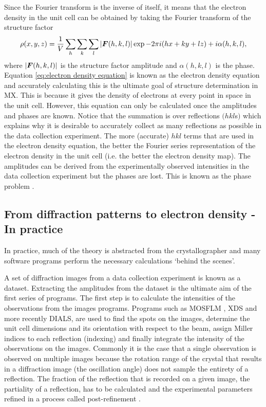         Since the Fourier transform is the inverse of itself, it means that the electron density in the unit cell can be obtained by taking the Fourier transform of the structure factor
        \begin{equation}
            \rho(x,y,z) = \frac{1}{V} \sum_h \sum_k \sum_l |\boldsymbol{F}(h,k,l)| \exp{-2\pi i (hx + ky + lz) + i \alpha(h,k,l)},
            \label{eq:electron density equation}
        \end{equation}
        where $|\boldsymbol{F}(h,k,l)|$ is the structure factor amplitude and $\alpha(h,k,l)$ is the phase. Equation \ref{eq:electron density equation} is known as the electron density equation and accurately calculating this is the ultimate goal of structure determination in MX.
        This is because it gives the density of electrons at every point in space in the unit cell.
        However, this equation can only be calculated once the amplitudes and phases are known.
        Notice that the summation is over reflections $(hkl$s$)$ which explains why it is desirable to accurately collect as many reflections as possible in the data collection experiment.
        The more (accurate) $hkl$ terms that are used in the electron density equation, the better the Fourier series representation of the electron density in the unit cell (i.e. the better the electron density map).
        The amplitudes can be derived from the experimentally observed intensities in the data collection experiment but the phases are lost. This is known as the phase problem \cite{taylor2010}.

    \subsection{From diffraction patterns to electron density - In practice}
    \label{sub:From diffraction patterns to electron density - In practice}
        In practice, much of the theory is abstracted from the crystallographer and many software programs perform the necessary calculations `behind the scenes'.

        A set of diffraction images from a data collection experiment is known as a dataset. Extracting the amplitudes from the dataset is the ultimate aim of the first series of programs.
        The first step is to calculate the intensities of the observations from the images programs.
        Programs such as MOSFLM \cite{leslie2007}, XDS \cite{kabsch2010} and more recently DIALS, are used to find the spots on the images, determine the unit cell dimensions and its orientation with respect to the beam, assign Miller indices to each reflection (indexing) and finally integrate the intensity of the observations on the images.
        Commonly it is the case that a single observation is observed on multiple images because the rotation range of the crystal that results in a diffraction image (the oscillation angle) does not sample the entirety of a reflection.
        The fraction of the reflection that is recorded on a given image, the partiality of a reflection, has to be calculated and the experimental parameters refined in a process called post-refinement \cite{rossmann1979processing, rossmann1979oscillation}.

